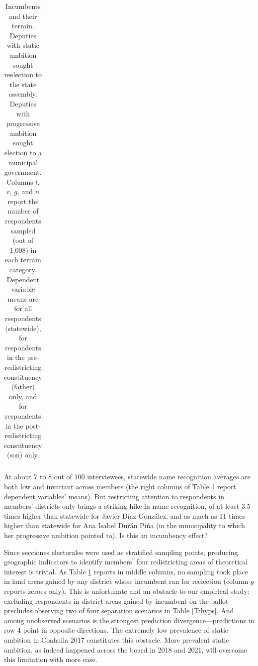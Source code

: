 \documentclass[letter,12pt]{article}
\begin{document}
\begin{table}
\begin{tabular}{llrrrrrrr}
  \\[-1.8ex] \hline
  \end{tabular}
  \caption{Incumbents and their terrain. Deputies with static ambition sought reelection to the state assembly. Deputies with progressive ambition sought election to a municipal government. Columns $l$, $r$, $g$, and $n$ report the number of respondents sampled (out of 1,008) in each terrain category. Dependent variable means are for all respondents (statewide), for respondents in the pre-redistricting constituency (father) only, and for respondents in the post-redistricting constituency (son) only.}\label{T:terrenos}
\end{table}

At about 7 to 8 out of 100 interviewees, statewide name recognition averages are both low and invariant across members (the right columns of Table \ref{T:terrenos} report dependent variables' means). But restricting attention to respondents in members' districts only brings a striking hike in name recognition, of at least 3.5 times higher than statewide for Javier Díaz González, and as much as 11 times higher than statewide for Ana Isabel Durán Piña (in the municipality to which her progressive ambition pointed to). Is this an incumbency effect? 

Since secciones electorales were used as stratified sampling points, producing geographic indicators to identify members' four redistricting areas of theoretical interest is trivial. As Table \ref{T:terrenos} reports in middle columns, no sampling took place in land areas gained by any district whose incumbent ran for reelection (column $g$ reports zeroes only). This is unfortunate and an obstacle to our empirical study: excluding respondents in district areas gained by incumbent on the ballot precludes observing two of four separation scenarios in Table \ref{T:hyps}. And among unobserved scenarios is the strongest prediction divergence---predictions in row 4 point in opposite directions. The extremely low prevalence of static ambition in Coahuila 2017 constitutes this obstacle. More prevalent static ambition, as indeed happened across the board in 2018 and 2021, will overcome this limitation with more ease.
\end{document}
